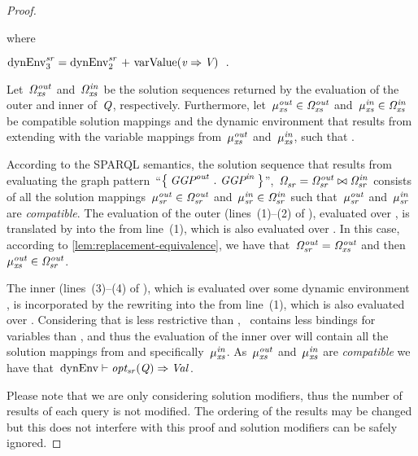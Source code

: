 \begin{proof}
\begin{description}
\begin{prooftreefunction}
    \end{prooftreefunction}%
    where
    \begin{small}
        $\mathrm{dynEnv}_{3}^{\mathit{sr}} = \mathrm{dynEnv}_{2}^{\mathit{sr}} \textrm{ + }\textrm{varValue}\!\left( \mathit{{v}_{}} \Rightarrow \mathit{{V}_{}} \right)\enspace .$
    \end{small}%
  \end{description}


  Let~${\mathit{\Omega}}_{\mathit{xs}}^{\mathit{out}}$ and~${\mathit{\Omega}}_{\mathit{xs}}^{\mathit{in}}$ be the solution sequences returned by the evaluation of the outer and inner
   of~$\mathit{{Q}_{}}$, respectively. 
  Furthermore, let~${\mathit{\mu}}_{\mathit{xs}}^{\mathit{out}} \in {\mathit{\Omega}}_{\mathit{xs}}^{\mathit{out}}$ and~${\mathit{\mu}}_{\mathit{xs}}^{\mathit{in}} \in {\mathit{\Omega}}_{\mathit{xs}}^{\mathit{in}}$ be compatible
  solution mappings and  the dynamic environment that results from extending \dyn with the variable
  mappings from~${\mathit{\mu}}_{\mathit{xs}}^{\mathit{out}}$ and~${\mathit{\mu}}_{\mathit{xs}}^{\mathit{in}}$, such that .


  According to the SPARQL semantics, the solution sequence that results from evaluating the graph
  pattern~``$\left\{\:{\mathit{{\textit{GGP}}}}_{\mathit{}}^{\mathit{out}}~.~{\mathit{{\textit{GGP}}}}_{\mathit{}}^{\mathit{in}}\:\right\}$'',~${\mathit{\Omega}}_{\mathit{sr}}^{\mathit{}} = {\mathit{\Omega}}_{\mathit{sr}}^{\mathit{out}} \bowtie
  {\mathit{\Omega}}_{\mathit{sr}}^{\mathit{in}}$ consists of all the solution mappings~${\mathit{\mu}}_{\mathit{sr}}^{\mathit{out}} \in {\mathit{\Omega}}_{\mathit{sr}}^{\mathit{out}}$ and~${\mathit{\mu}}_{\mathit{sr}}^{\mathit{in}} \in
  {\mathit{\Omega}}_{\mathit{sr}}^{\mathit{in}}$ such that~${\mathit{\mu}}_{\mathit{sr}}^{\mathit{out}}$ and~${\mathit{\mu}}_{\mathit{sr}}^{\mathit{in}}$ are \emph{compatible}.
  The evaluation of the outer \SparqlForClause (lines~(1)--(2) of ), evaluated over \dyn, is translated by
   into the  from line~(1), which is also evaluated over \dyn.
  In this case, according to \cref{lem:replacement-equivalence}, we have that~${\mathit{\Omega}}_{\mathit{sr}}^{\mathit{out}} =
  {\mathit{\Omega}}_{\mathit{xs}}^{\mathit{out}}$ and then~${\mathit{\mu}}_{\mathit{xs}}^{\mathit{out}} \in {\mathit{\Omega}}_{\mathit{sr}}^{\mathit{out}}$.
  

  The inner \SparqlForClause (lines~(3)--(4) of ), which is evaluated over some dynamic environment
  , is incorporated by the  rewriting into the  from line~(1),
  which is also evaluated over \dyn.
  Considering that \dyn is less restrictive than , \ie~\dyn contains less bindings for variables than
  , and thus the evaluation of the inner \SparqlForClause over \dyn will contain all the solution mappings
  from  and specifically~${\mathit{\mu}}_{\mathit{xs}}^{\mathit{in}}$.
  As~${\mathit{\mu}}_{\mathit{xs}}^{\mathit{out}}$ and~${\mathit{\mu}}_{\mathit{xs}}^{\mathit{in}}$ are \emph{compatible} we have that~${\textrm{dynEnv}} \vdash \mathit{opt_{sr}}\!\left(\mathit{{Q}_{}}\right) \Rightarrow
  \mathit{{Val}_{}}$.


  Please note that we are only considering \ORDERBY solution modifiers, thus the number of results of each query is not
  modified.  The ordering of the results may be changed but this does not interfere with this proof and solution
  modifiers can be safely ignored.



\end{proof}
